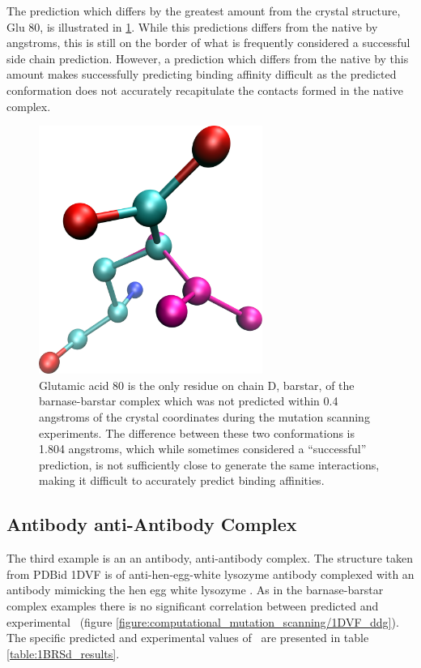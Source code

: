 The prediction which differs by the greatest amount from the crystal structure, Glu 80, is illustrated in \ref{figure:computational_mutation_scanning/1brs_d_80}.
While this predictions differs from the native by  angstroms, this is still on the border of what is frequently considered a successful side chain prediction.
However, a prediction which differs from the native by this amount makes successfully predicting binding affinity difficult as the predicted conformation does not accurately recapitulate the contacts formed in the native complex.
\begin{figure}[h]
    \centering
    \includegraphics[width=0.65\textwidth,height=0.3\textheight,keepaspectratio]{figures/mutation_side_chain_images/1brs_chain_d_80.png}
    \caption{Glutamic acid 80 is the only residue on chain D, barstar, of the barnase-barstar complex which was not predicted within 0.4 angstroms of the crystal coordinates during the mutation scanning experiments.
    The difference between these two conformations is 1.804 angstroms, which while sometimes considered a ``successful'' prediction, is not sufficiently close to generate the same interactions, making it difficult to accurately predict binding affinities.}
    \label{figure:computational_mutation_scanning/1brs_d_80}
\end{figure}

\FloatBarrier
\subsection{Antibody anti-Antibody Complex}
The third example is an an antibody, anti-antibody complex.
The structure taken from PDBid 1DVF is of anti-hen-egg-white lysozyme antibody complexed with an antibody mimicking the hen egg white lysozyme \cite{braden1996crystal}.
As in the barnase-barstar complex examples there is no significant correlation between predicted and experimental \ddg\ (figure \ref{figure:computational_mutation_scanning/1DVF_ddg}).
The specific predicted and experimental values of \ddg\ are presented in table \ref{table:1BRSd_results}.

